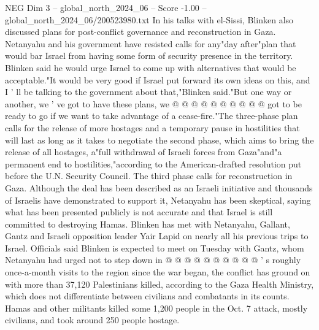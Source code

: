 \begin{textsample}{NEG Dim 3 – global\_north\_2024\_06 – Score -1.00 – global\_north\_2024\_06/200523980.txt}
In his talks with el-Sissi, Blinken also discussed plans for post-conflict governance and reconstruction in Gaza.
Netanyahu and his government have resisted calls for any"day after"plan that would bar Israel from having some form of security presence in the territory.
Blinken said he would urge Israel to come up with alternatives that would be acceptable."It would be very good if Israel put forward its own ideas on this, and I ' ll be talking to the government about that,"Blinken said."But one way or another, we ' ve got to have these plans, we @ @ @ @ @ @ @ @ @ @ got to be ready to go if we want to take advantage of a cease-fire."The three-phase plan calls for the release of more hostages and a temporary pause in hostilities that will last as long as it takes to negotiate the second phase, which aims to bring the release of all hostages, a"full withdrawal of Israeli forces from Gaza"and"a permanent end to hostilities,"according to the American-drafted resolution put before the U.N.
Security Council.
The third phase calls for reconstruction in Gaza.
Although the deal has been described as an Israeli initiative and thousands of Israelis have demonstrated to support it, Netanyahu has been skeptical, saying what has been presented publicly is not accurate and that Israel is still committed to destroying Hamas.
Blinken has met with Netanyahu, Gallant, Gantz and Israeli opposition leader Yair Lapid on nearly all his previous trips to Israel.
Officials said Blinken is expected to meet on Tuesday with Gantz, whom Netanyahu had urged not to step down in @ @ @ @ @ @ @ @ @ @ ' s roughly once-a-month visits to the region since the war began, the conflict has ground on with more than 37,120 Palestinians killed, according to the Gaza Health Ministry, which does not differentiate between civilians and combatants in its counts.
Hamas and other militants killed some 1,200 people in the Oct. 7 attack, mostly civilians, and took around 250 people hostage.

\end{textsample}

